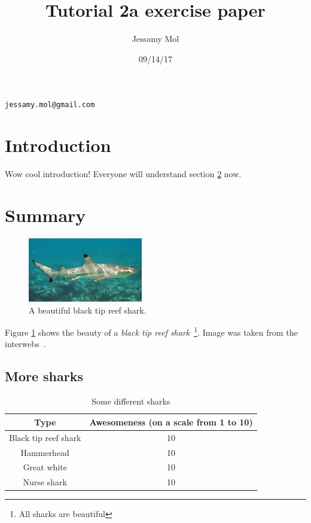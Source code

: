 \documentclass[a4paper,10pt,twoside]{article}
\author{Jessamy Mol}
\title{Tutorial 2a exercise paper}
\date{09/14/17}
\begin{document}
\maketitle

\begin{center}
 \texttt{jessamy.mol@gmail.com}
\end{center}

\section{Introduction}
\label{sec:intro}

Wow cool introduction! Everyone will understand section \ref{sec:sum} now.

\section{Summary}
\label{sec:sum}

\begin{figure}[h]
 \begin{center}
  \includegraphics[width=5cm]{shark.jpg}
  \caption{A beautiful black tip reef shark.}
  \label{fig:shark}
 \end{center}
\end{figure}

Figure \ref{fig:shark} shows the beauty of a \textit{black tip reef shark}~\footnote{All sharks are beautiful}. Image was taken from the interwebs~\cite{webs}.  

\subsection{More sharks}
\label{sec:more}

\begin{table}[h]
 \begin{center}
  \caption{Some different sharks}
  \begin{tabular}{c|c}
   \textbf{Type} & \textbf{Awesomeness (on a scale from 1 to 10)} \\ \hline 
   Black tip reef shark & 10 \\
   Hammerhead & 10 \\
   Great white & 10 \\
   Nurse shark & 10 \\
  \end{tabular}

 \end{center}
\end{table}
\end{document}
